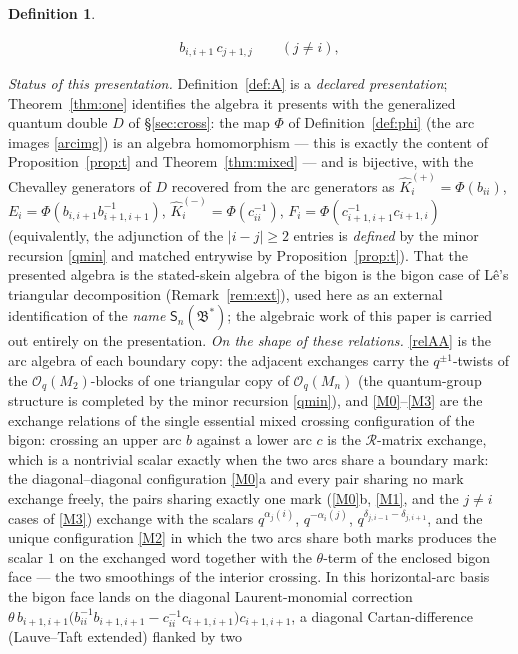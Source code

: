 \documentclass[11pt]{article}
\theoremstyle{definition}
\newtheorem{definition}[theorem]{Definition}
\theoremstyle{remark}
\newcommand{\B}{\mathfrak{B}}
\newcommand{\Sn}{\mathsf{S}_n}
\newcommand{\hK}{\hat K}
\newcommand{\tht}{\theta}
\begin{document}
\begin{definition}
\begin{enumerate}[label=(\Alph*),leftmargin=2.2em]
\begin{align}
  b_{i,i+1}\,c_{j+1,j}\qquad(j\ne i),
  \label{M3}\tag{M3}
  \end{align}
\end{enumerate}
\emph{Status of this presentation.}  Definition~\ref{def:A} is a
\emph{declared presentation}; Theorem~\ref{thm:one} identifies the
algebra it presents with the generalized quantum double $D$ of
\S\ref{sec:cross}: the map $\Phi$ of Definition~\ref{def:phi} (the
arc images \eqref{arcimg}) is an algebra homomorphism — this is
exactly the content of Proposition~\ref{prop:t} and
Theorem~\ref{thm:mixed} — and is bijective, with the Chevalley
generators of $D$ recovered from the arc generators as
$\hK_i^{(+)}=\Phi(b_{ii})$,
$E_i=\Phi(b_{i,i+1}b_{i+1,i+1}^{-1})$,
$\hK_i^{(-)}=\Phi(c_{ii}^{-1})$,
$F_i=\Phi(c_{i+1,i+1}^{-1}c_{i+1,i})$ (equivalently, the adjunction
of the $|i-j|\ge2$ entries is \emph{defined} by the minor recursion
\eqref{qmin} and matched entrywise by Proposition~\ref{prop:t}).  That the
presented algebra is the stated-skein algebra of the bigon is the
bigon case of L\^e's triangular decomposition
(Remark~\ref{rem:ext}), used here as an external identification of
the \emph{name} $\Sn(\B^*)$; the algebraic work of this paper is
carried out entirely on the presentation.
\emph{On the shape of these relations.}  \eqref{relAA} is the
arc algebra of each boundary copy: the adjacent exchanges carry the
$q^{\pm1}$-twists of the $\mathcal O_q(M_2)$-blocks of one
triangular copy of $\mathcal O_q(M_n)$ (the quantum-group structure
is completed by the minor recursion \eqref{qmin}), and
\eqref{M0}--\eqref{M3} are the exchange relations of the single
essential mixed crossing configuration of the bigon: crossing an
upper arc $b$ against a lower arc $c$ is the $\mathcal R$-matrix
exchange, which is a nontrivial scalar exactly when the two arcs
share a boundary mark: the diagonal--diagonal configuration
\eqref{M0}a and every pair sharing no mark exchange freely, the
pairs sharing exactly one mark (\eqref{M0}b, \eqref{M1}, and the
$j\neq i$ cases of \eqref{M3}) exchange with the scalars
$q^{\alpha_j(i)}$, $q^{-\alpha_i(j)}$, $q^{\delta_{j,i-1}-
\delta_{j,i+1}}$, and the unique configuration \eqref{M2} in which
the two arcs share both marks produces the scalar $1$ on the
exchanged word together with the $\tht$-term of the enclosed bigon
face — the two smoothings of the interior crossing.  In this
horizontal-arc basis the bigon face lands on the diagonal
Laurent-monomial correction
$\tht\,b_{i+1,i+1}\bigl(b_{ii}^{-1}b_{i+1,i+1}
 -c_{ii}^{-1}c_{i+1,i+1}\bigr)c_{i+1,i+1}$,
a diagonal Cartan-difference (Lauve--Taft extended) flanked by two

\end{definition}
\end{document}
